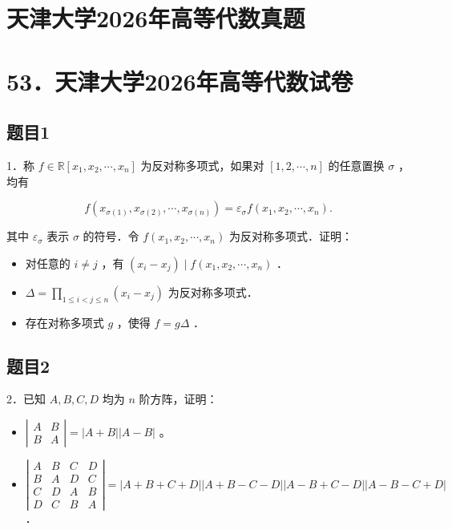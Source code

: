 \documentclass{article}
\begin{document}
\section*{天津大学2026年高等代数真题}
\section*{53．天津大学2026年高等代数试卷}

\subsection{题目1}
1．称 \(f \in \mathbb{R}\left[x_{1}, x_{2}, \cdots, x_{n}\right]\) 为反对称多项式，如果对 \([1,2, \cdots, n]\) 的任意置换 \(\sigma\) ，均有

\[
f\left(x_{\sigma(1)}, x_{\sigma(2)}, \cdots, x_{\sigma(n)}\right)=\varepsilon_{\sigma} f\left(x_{1}, x_{2}, \cdots, x_{n}\right) .
\]

其中 \(\varepsilon_{\sigma}\) 表示 \(\sigma\) 的符号．令 \(f\left(x_{1}, x_{2}, \cdots, x_{n}\right)\) 为反对称多项式．证明：

\begin{itemize}
  \item[（1）] 对任意的 \(i \neq j\) ，有 \(\left(x_{i}-x_{j}\right) \mid f\left(x_{1}, x_{2}, \cdots, x_{n}\right)\) ．
  \item[（2）] \(\Delta=\prod_{1 \leq i<j \leq n}\left(x_{i}-x_{j}\right)\) 为反对称多项式．
  \item[（3）] 存在对称多项式 \(g\) ，使得 \(f=g \Delta\) ．
\end{itemize}

\subsection{题目2}
2．已知 \(A, B, C, D\) 均为 \(n\) 阶方阵，证明：

\begin{itemize}
  \item[（1）] \(\left|\begin{array}{ll}A & B \\ B & A\end{array}\right|=|A+B||A-B|\) 。
  \item[（2）] \(\left|\begin{array}{llll}A & B & C & D \\ B & A & D & C \\ C & D & A & B \\ D & C & B & A\end{array}\right|=|A+B+C+D||A+B-C-D||A-B+C-D||A-B-C+D|\) ．
\end{itemize}
\end{document}
